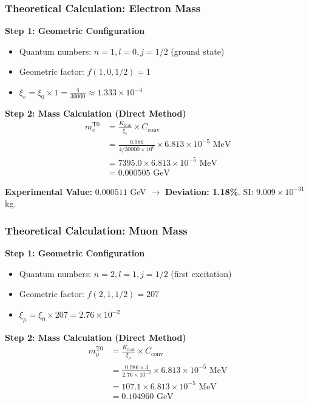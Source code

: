 	\subsubsection{Theoretical Calculation: Electron Mass}
	
	\textbf{Step 1: Geometric Configuration}
	\begin{itemize}
		\item Quantum numbers: $n=1, l=0, j=1/2$ (ground state)
		\item Geometric factor: $f(1,0,1/2) = 1$
		\item $\xi_e = \xi_0 \times 1 = \frac{4}{30000} \approx 1.333 \times 10^{-4}$
	\end{itemize}
	
	\textbf{Step 2: Mass Calculation (Direct Method)}
	\begin{align}
		m_e^{\text{T0}} &= \frac{K_{\text{frak}}}{\xi_e} \times C_{\text{conv}} \\
		&= \frac{0.986}{4/30000 \times 10^{0}} \times 6.813 \times 10^{-5} \text{ MeV} \\
		&= 7395.0 \times 6.813 \times 10^{-5} \text{ MeV} \\
		&= 0.000505 \text{ GeV}
	\end{align}
	
	\textbf{Experimental Value:} $0.000511$ GeV $\rightarrow$ \textbf{Deviation: 1.18\%}. SI: $9.009 \times 10^{-31}$ kg.
	
	\subsubsection{Theoretical Calculation: Muon Mass}
	
	\textbf{Step 1: Geometric Configuration}
	\begin{itemize}
		\item Quantum numbers: $n=2, l=1, j=1/2$ (first excitation)
		\item Geometric factor: $f(2,1,1/2) = 207$
		\item $\xi_\mu = \xi_0 \times 207 = 2.76 \times 10^{-2}$
	\end{itemize}
	
	\textbf{Step 2: Mass Calculation (Direct Method)}
	\begin{align}
		m_\mu^{\text{T0}} &= \frac{K_{\text{frak}}}{\xi_\mu} \times C_{\text{conv}} \\
		&= \frac{0.986 \times 3}{2.76 \times 10^{-2}} \times 6.813 \times 10^{-5} \text{ MeV} \\
		&= 107.1 \times 6.813 \times 10^{-5} \text{ MeV} \\
		&= 0.104960 \text{ GeV}
	\end{align}
	
